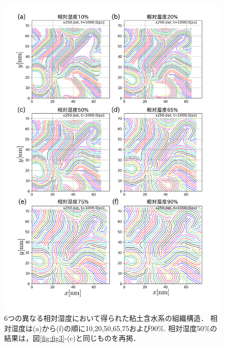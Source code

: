 \begin{figure}
	\begin{center}
	\includegraphics[width=0.8\linewidth]{Figs/fig4.pdf} 
	\end{center}
	\caption{
		6つの異なる相対湿度において得られた粘土含水系の組織構造．
		相対湿度は(a)から(f)の順に10,20,50,65,75および90$\%$. 
		相対湿度50$\%$の結果は，図\ref{fig:fig3}-(c)と同じものを再掲．
	} 
	\label{fig:fig4}
\end{figure}
